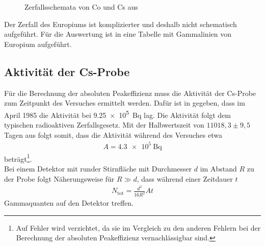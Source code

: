 \begin{figure}[h]
\begin{subfigure}[h]{0.4\textwidth}
  \end{subfigure}
  \caption{Zerfallsschemata von Co und Cs aus \cite{praktikumsheft}}
  \label{fig:schema}
\end{figure} 
   
Der Zerfall des Europiums ist komplizierter und deshalb nicht schematisch aufgeführt. Für die Auswertung ist in \cite{praktikumsheft} eine Tabelle mit Gammalinien von Europium aufgeführt.

\subsection{Aktivität der Cs-Probe}
Für die Berechnung der absoluten Peakeffizienz muss die Aktivität der Cs-Probe zum Zeitpunkt des Versuches ermittelt werden. Dafür ist in \cite{praktikumsheft} gegeben, dass im April 1985 die Aktivität bei \SI{9.25e5}{\becquerel} lag. Die Aktivität folgt dem typischen radioaktiven Zerfallsgesetz. Mit der Halbwertszeit von $11018,3 \pm 9,5$ Tagen aus \cite{lebensdauer} folgt somit, dass die Aktivität während des Versuches etwa 
\begin{align*}
  A=\SI{4.3e5}{\becquerel}
\end{align*}
beträgt\footnote{Auf Fehler wird verzichtet, da sie im Vergleich zu den anderen Fehlern bei der Berechnung der absoluten Peakeffizienz vernachlässigbar sind.}.\\

Bei einem Detektor mit runder Stirnfläche mit Durchmesser $d$ im Abstand $R$ zu der Probe folgt Näherungsweise für $R \gg d$, dass während einer Zeitdauer $t$
\begin{align}
  N_\mathrm{tot}= \frac{d^2}{16 R^2}At
  \label{eq:ntot}
\end{align}
Gammaquanten auf den Detektor treffen.
